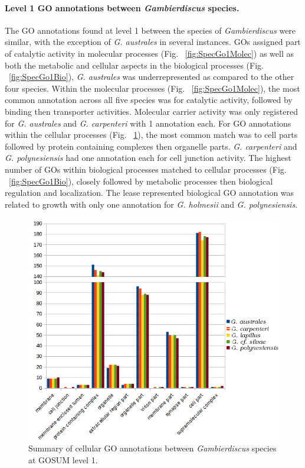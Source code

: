 \documentclass[12pt]{article}
\begin{document}
\paragraph{Level 1 GO annotations between \textit{Gambierdiscus} species.}
\FloatBarrier
The GO annotations found at level 1 between the species of \textit{Gambierdiscus} were similar, with the exception of \textit{G. australes} in several instances. 
GOs assigned part of catalytic activity in molecular processes (Fig. ~\ref{fig:SpecGo1Molec}) as well as both the metabolic and cellular aspects in the biological processes (Fig. ~\ref{fig:SpecGo1Bio}), \textit{G. australes} was underrepresented as compared to the other four species. 
Within the molecular processes (Fig. ~\ref{fig:SpecGo1Molec}), the most common annotation across all five species was for catalytic activity, followed by binding then transporter activities. 
Molecular carrier activity was only registered for \textit{G. australes} and \textit{G. carpenteri} with 1 annotation each.
For GO annotations within the cellular processes (Fig. ~\ref{fig:SpecGo1Cell}), the most common match was to cell parts followed by protein containing complexes then organelle parts. 
\textit{G. carpenteri} and \textit{G. polynesiensis} had one annotation each for cell junction activity. 
The highest number of GOs within biological processes matched to cellular processes (Fig. ~\ref{fig:SpecGo1Bio}), closely followed by metabolic processes then biological regulation and localization. 
The lease represented biological GO annotation was related to growth with only one annotation for \textit{G. holmesii} and \textit{G. polynesiensis}.

\begin{figure} 
\includegraphics[scale=.9]{3Aug18_cluster-investigation/figures/gosum-species/Species-gosum1-cell-split.png} 
\caption{Summary of cellular GO annotations between \textit{Gambierdiscus} species at GOSUM level 1.}%
\label{fig:SpecGo1Cell}
\end{figure} 
\end{document}
